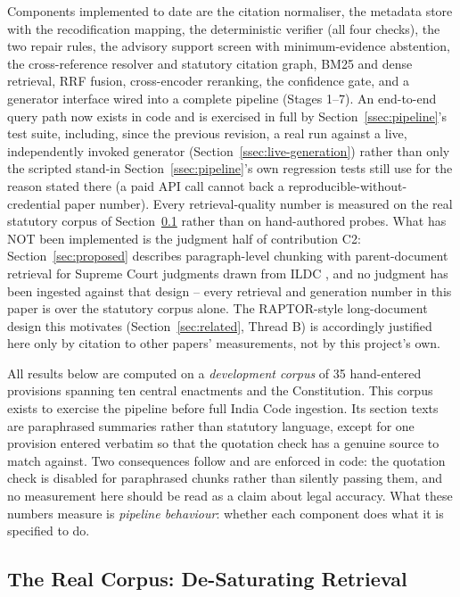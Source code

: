 \documentclass[conference]{IEEEtran}
\begin{document}
Components implemented to date are the citation normaliser, the metadata store
with the recodification mapping, the deterministic verifier (all four checks),
the two repair rules, the advisory support screen with minimum-evidence
abstention, the cross-reference resolver and statutory citation graph, BM25 and
dense retrieval, RRF fusion, cross-encoder reranking, the confidence gate, and
a generator interface wired into a complete pipeline (Stages 1--7). An
end-to-end query path now exists in code and is exercised in full by
Section~\ref{ssec:pipeline}'s test suite, including, since the previous
revision, a real run against a live, independently invoked generator
(Section~\ref{ssec:live-generation}) rather than only the scripted stand-in
Section~\ref{ssec:pipeline}'s own regression tests still use for the reason
stated there (a paid API call cannot back a reproducible-without-credential
paper number). Every retrieval-quality number is measured on the real
statutory corpus of Section~\ref{ssec:realcorpus} rather than on hand-authored
probes. What has NOT been implemented is the judgment half of contribution
C2: Section~\ref{sec:proposed} describes paragraph-level chunking with
parent-document retrieval for Supreme Court judgments drawn from ILDC
\cite{malik2021}, and no judgment has been ingested against that design --
every retrieval and generation number in this paper is over the statutory
corpus alone. The RAPTOR-style long-document design this motivates
(Section~\ref{sec:related}, Thread B) is accordingly justified here only by
citation to other papers' measurements, not by this project's own.

All results below are computed on a \emph{development corpus} of 35
hand-entered provisions spanning ten central enactments and the Constitution.
This corpus exists to exercise the pipeline before full India Code ingestion.
Its section texts are paraphrased summaries rather than statutory language,
except for one provision entered verbatim so that the quotation check has a
genuine source to match against. Two consequences follow and are enforced in
code: the quotation check is disabled for paraphrased chunks rather than
silently passing them, and no measurement here should be read as a claim about
legal accuracy. What these numbers measure is \emph{pipeline behaviour}: whether
each component does what it is specified to do.

\subsection{The Real Corpus: De-Saturating Retrieval}
\label{ssec:realcorpus}
\end{document}
